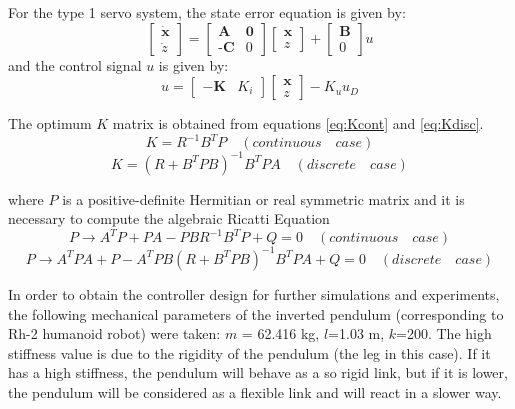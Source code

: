 For the type 1 servo system, the state error equation is given by:
\begin{equation}
\begin{bmatrix}
\dot{\textbf{x}}\\
\dot{z}
\end{bmatrix} = 
\begin{bmatrix}
\textbf{A} & \textbf{0}\\
\textbf{-C} & 0
\end{bmatrix}
\begin{bmatrix}
\textbf{x}\\
z
\end{bmatrix} + 
\begin{bmatrix}
\textbf{B}\\
0
\end{bmatrix}
u
\end{equation}
and the control signal $u$ is given by:
\begin{equation}
u = \begin{bmatrix}
-\textbf{K} & K_i
\end{bmatrix}
\begin{bmatrix}
\textbf{x}\\
z 
\end{bmatrix}
- K_u u_D
\end{equation}

The optimum $K$ matrix is obtained from equations \ref{eq:Kcont} and \ref{eq:Kdisc}.
\begin{equation}
K = R^{-1}B^{T}P \quad (continuous \quad case)
\label{eq:Kcont}
\end{equation}
\begin{equation}
K = (R + B^{T}PB)^{-1}B^{T}PA \quad (discrete \quad case)
\label{eq:Kdisc}
\end{equation}

where $P$ is a positive-definite Hermitian or real symmetric matrix and it is necessary to compute the algebraic Ricatti Equation
\begin{equation}
P \rightarrow A^{T}P+PA-PBR^{-1}B^{T}P+Q = 0 \quad (continuous \quad case)
\end{equation}
\begin{equation}
P \rightarrow A^{T}PA+P-A^{T}PB(R+B^{T}PB)^{-1}B^{T}PA+Q = 0 \quad (discrete \quad case)
\end{equation}


In order to obtain the controller design for further simulations and experiments, the following mechanical parameters of the inverted pendulum (corresponding to Rh-2 humanoid robot) were taken: $m$ = 62.416 kg, $l$=1.03 m, $k$=200. The high stiffness value is due to the rigidity of the pendulum (the leg in this case). If it has a high stiffness, the pendulum will behave as a so rigid link, but if it is lower, the pendulum will be considered as a flexible link and will react in a slower way.

